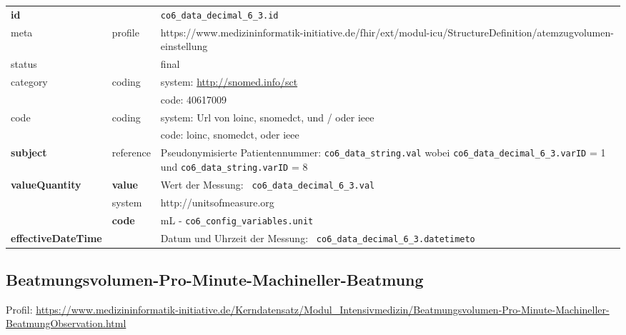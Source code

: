 \begin{longtable}{|l|l|p{7.5cm}|}
        \hline
        \rowcolor{lightgray} \multicolumn{3}{|l|}{Data Mapping (inhaltlich)} \\ \hline
        \textbf{id} &  & \texttt{co6\_data\_decimal\_6\_3.id} \\ \hline
	meta & profile & https://www.medizininformatik-initiative.de/fhir/ext/modul-icu/StructureDefinition/atemzugvolumen-einstellung \\ \hline 
	status &  & final   \\ \hline 
	category & coding & system: \url{http://snomed.info/sct} \\
\cline{3-3}
	& & code: 40617009 \\ \hline
	code & coding & system: Url von \ac{loinc}, \ac{snomedct}, und / oder \ac{ieee} \\ 
	\cline{3-3} 
	 &  & code: \ac{loinc}, \ac{snomedct}, oder \ac{ieee} \\ \hline
	 \textbf{subject} & reference & Pseudonymisierte Patientennummer: \texttt{co6\_data\_string.val} wobei \texttt{co6\_data\_decimal\_6\_3.varID} = 1 und \texttt{co6\_data\_string.varID} = 8 \\ \hline
	 \textbf{valueQuantity}  & \textbf{value} & Wert der Messung: \texttt{
co6\_data\_decimal\_6\_3.val} \\
        \cline{2-3}
         & system & http://unitsofmeasure.org \\
         \cline{2-3}
         & \textbf{code} & mL - \texttt{co6\_config\_variables.unit}
\\ \hline
     \textbf{effectiveDateTime}  & & Datum und Uhrzeit der Messung: \texttt{
co6\_data\_decimal\_6\_3.datetimeto} \\
     \hline
\end{longtable}


\subsection{Beatmungsvolumen-Pro-Minute-Machineller-Beatmung} 

Profil: \url{https://www.medizininformatik-initiative.de/Kerndatensatz/Modul_Intensivmedizin/Beatmungsvolumen-Pro-Minute-Machineller-BeatmungObservation.html}

